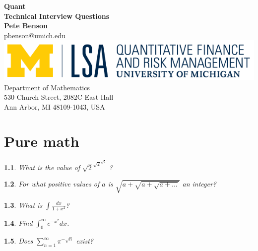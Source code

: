 \documentclass{report}
\newtheorem{problem}{}
\numberwithin{problem}{chapter} %
\newcommand{\ds}{\displaystyle}
\begin{document}
\begin{titlepage}
\begin{center}
 {\huge\bfseries Quant\\Technical Interview Questions\\}
 \vspace{1.5cm}
 {\bfseries Pete Benson}\\[5pt]
 pbenson@umich.edu\\[14pt]
 \vspace{10cm}
\includegraphics{QFRM_rgb}\\[5pt]
{Department of Mathematics}\\[5pt]
{530 Church Street, 2082C East Hall}\\[5pt]
{Ann Arbor, MI 48109-1043,
 USA}\\
 \vfill

\end{center}
\end{titlepage}

\chapter{Pure math}

\begin{problem}
\cite{CRACK}
What is the value of $\sqrt{2}^{\sqrt{2}^{{\sqrt{2}^{...}}}}$?
\end{problem}

\begin{problem}
For what positive values of $a$ is $\sqrt{a +\sqrt{a +\sqrt{a +...}}}$  an integer?
\end{problem}

\begin{problem}
What is $\ds \int \frac{dx}{1+x^2}$?
\end{problem}

\begin{problem}
Find $\ds \int_0^\infty e^{-x^2}dx$.
\end{problem}

\begin{problem}
Does $\ds \sum_{n=1}^\infty \pi^{-\sqrt{n}}$ exist?
\end{problem}
\end{document}
